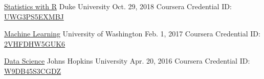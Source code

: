 
\begin{cventries}

\cventry
    {\href{https://www.coursera.org/account/accomplishments/specialization/2VHFDHW5GUK6}{Statistics with R}} %
    {Duke University} %
    {Oct. 29, 2018} %
    {Coursera} %
    {
      Credential ID: \href{https://www.coursera.org/account/accomplishments/specialization/UWG3PS5EXMBJ}{UWG3PS5EXMBJ}
    }

\cventry
    {\href{https://www.coursera.org/account/accomplishments/specialization/2VHFDHW5GUK6}{Machine Learning}} %
    {University of Washington} %
    {Feb. 1, 2017} %
    {Coursera} %
    {
      Credential ID: \href{https://www.coursera.org/account/accomplishments/specialization/2VHFDHW5GUK6}{2VHFDHW5GUK6}
    }

\cventry
    {\href{https://www.coursera.org/account/accomplishments/specialization/W9DB45S3CGDZ}{Data Science}} %
    {Johns Hopkins University} %
    {Apr. 20, 2016} %
    {Coursera} %
    {
      Credential ID: \href{https://www.coursera.org/account/accomplishments/specialization/W9DB45S3CGDZ}{W9DB45S3CGDZ}
    }

\end{cventries}